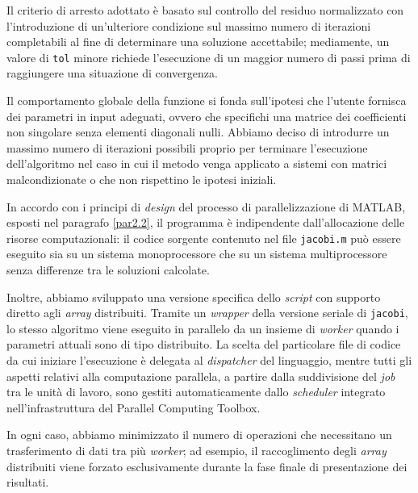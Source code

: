 Il criterio di arresto adottato \`e basato sul controllo del residuo normalizzato con l'introduzione di un'ulteriore condizione sul massimo numero di 
iterazioni completabili al fine di determinare una soluzione accettabile; mediamente, un valore di \lstinline{tol} minore richiede 
l'esecuzione di un maggior numero di passi prima di raggiungere una situazione di convergenza.

Il comportamento globale della funzione si fonda sull'ipotesi che l'utente fornisca dei parametri in input adeguati, ovvero che specifichi una matrice dei 
coefficienti non singolare senza elementi diagonali nulli.\newline
Abbiamo deciso di introdurre un massimo numero di iterazioni possibili proprio per terminare l'esecuzione dell'algoritmo nel caso in cui il metodo venga 
applicato a sistemi con matrici malcondizionate o che non rispettino le ipotesi iniziali.

In accordo con i principi di \textit{design} del processo di parallelizzazione di MATLAB, esposti nel paragrafo \ref{par2.2}, il programma \`e 
indipendente dall'allocazione delle risorse computazionali: il codice sorgente contenuto nel file \lstinline{jacobi.m} pu\`o essere eseguito sia su un 
sistema monoprocessore che su un sistema multiprocessore senza differenze tra le soluzioni calcolate.

Inoltre, abbiamo sviluppato una versione specifica dello \textit{script} con supporto diretto agli \textit{array} distribuiti.\newline
Tramite un \textit{wrapper} della versione seriale di \lstinline{jacobi}, lo stesso algoritmo viene eseguito in parallelo da un insieme di \textit{worker} 
quando i parametri attuali sono di tipo distribuito.\newline
La scelta del particolare file di codice da cui iniziare l'esecuzione \`e delegata al \textit{dispatcher} del linguaggio, 
mentre tutti gli aspetti relativi alla computazione parallela, a partire dalla suddivisione del \textit{job} tra le unit\`a di lavoro, sono 
gestiti automaticamente dallo \textit{scheduler} integrato nell'infrastruttura del Parallel Computing Toolbox.

In ogni caso, abbiamo minimizzato il numero di operazioni che necessitano un trasferimento di dati tra pi\`u \textit{worker}; ad esempio, 
il raccoglimento degli \textit{array} distribuiti viene forzato esclusivamente durante la fase finale di presentazione dei risultati.

